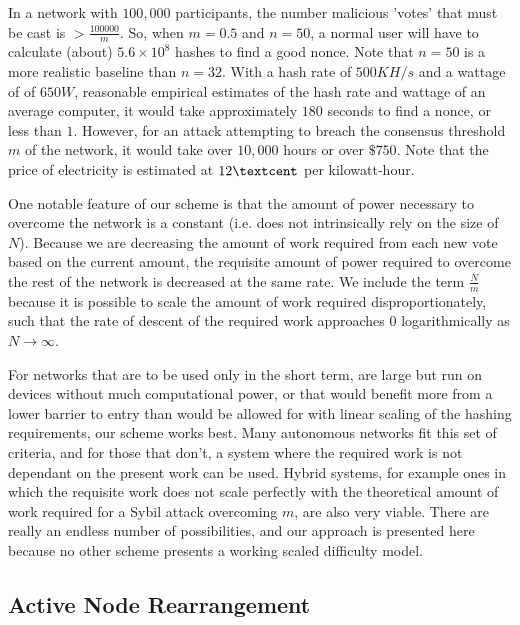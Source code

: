 \documentclass[10pt]{IEEEtran}
\begin{document}
\par In a network with $100,000$ participants, the number malicious 'votes' that must be cast is $ > \frac{100000}{m}$. So, when $m = 0.5$ and $n = 50$, a normal user will have to calculate (about) $5.6\times{}10^8$ hashes to find a good nonce. Note that $n = 50$ is a more realistic baseline than $n = 32$. With a hash rate of $500KH/s$ and a wattage of of $650W$, reasonable empirical estimates of the hash rate and wattage of an average computer, it would take approximately $180$ seconds to find a nonce, or less than $1$\textcent. However, for an attack attempting to breach the consensus threshold $m$ of the network, it would take over $10,000$ hours or over $\$750$. Note that the price of electricity is estimated at $12\textcent$ per kilowatt-hour. 

\par One notable feature of our scheme is that the amount of power necessary to overcome the network is a constant (i.e. does not intrinsically rely on the size of $N$). Because we are decreasing the amount of work required from each new vote based on the current amount, the requisite amount of power required to overcome the rest of the network is decreased at the same rate. We include the term $\frac{N}{m}$ because it is possible to scale the amount of work required disproportionately, such that the rate of descent of the required work approaches $0$ logarithmically as $N \to \infty$.

\par For networks that are to be used only in the short term, are large but run on devices without much computational power, or that would benefit more from a lower barrier to entry than would be allowed for with linear scaling of the hashing requirements, our scheme works best. Many autonomous networks fit this set of criteria, and for those that don't, a system where the required work is not dependant on the present work can be used. Hybrid systems, for example ones in which the requisite work does not scale perfectly with the theoretical amount of work required for a Sybil attack overcoming $m$, are also very viable. There are really an endless number of possibilities, and our approach is presented here because no other scheme presents a working scaled difficulty model.


\subsection{Active Node Rearrangement}
\end{document}
